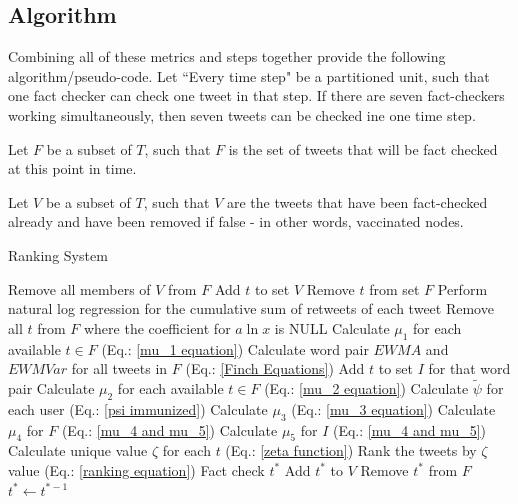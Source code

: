 \documentclass[preprint,review,12pt]{elsarticle}
\begin{document}
\subsection{Algorithm}
Combining all of these metrics and steps together provide the following algorithm/pseudo-code. Let ``Every time step" be a partitioned unit, such that one fact checker can check one tweet in that step. If there are seven fact-checkers working simultaneously, then seven tweets can be checked ine one time step.

Let $F$ be a subset of $T$, such that $F$ is the set of tweets that will be fact checked at this point in time.

Let $V$ be a subset of $T$, such that $V$ are the tweets that have been fact-checked already and have been removed if false - in other words, vaccinated nodes.

\begin{algorithm}
\label{Ranking System Algorithm}
	\caption{Ranking System}
	\begin{algorithmic}[1]
		\State Remove all members of $V$ from $F$
		\State Add $t$ to set $V$
		\State Remove $t$ from set $F$
		\EndIf
		\State Perform natural log regression for the cumulative sum of retweets of each tweet
		\State Remove all $t$ from $F$ where the coefficient for $a\ln x$ is NULL
		\State Calculate $\mu_1$ for each available $t \in F$
		(Eq.: \ref{mu_1 equation})
		\State Calculate word pair $EWMA$ and $EWMVar$ for all tweets in $F$ (Eq.: \ref{Finch Equations})
		\State Add $t$ to set $I$ for that word pair
		\EndIf
		\State Calculate $\mu_2$ for each available $t \in F$ (Eq.: \ref{mu_2 equation})
		\State Calculate $\tilde{\psi}$ for each user (Eq.: \ref{psi immunized})
		\State Calculate $\mu_3$ (Eq.: \ref{mu_3 equation})
		\State Calculate $\mu_4$ for $F$ (Eq.: \ref{mu_4 and mu_5})
		\State Calculate $\mu_5$ for $I$ (Eq.: \ref{mu_4 and mu_5})
		\EndIf
		\State Calculate unique value $\zeta$ for each $t$ (Eq.: \ref{zeta function})
		\State Rank the tweets by $\zeta$ value (Eq.: \ref{ranking equation})
		\State Fact check $t^*$ 
		\State Add $t^*$ to $V$
		\State Remove $t^*$ from $F$
		\State $t^* \xleftarrow[]{} t^{*-1}$
		\EndFor
		\EndWhile
		\EndFor
	\end{algorithmic} 
\end{algorithm} 
\newpage
\end{document}
